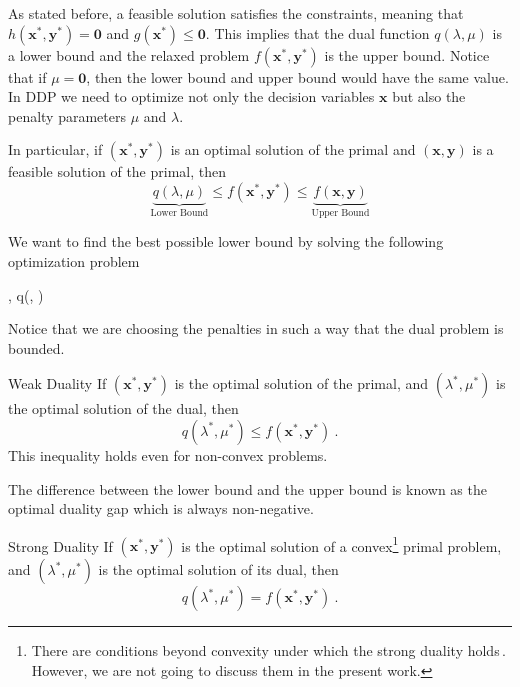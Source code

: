 As stated before, a feasible solution satisfies the constraints, meaning that $h(\mathbf{x}^{*}, \mathbf{y}^{*})=\mathbf{0}$ and $g(\mathbf{x}^{*}) \leq \mathbf{0}$. This implies that the dual function $q(\lambda,\mu)$ is a lower bound and the relaxed problem $f(\mathbf{x}^{*}, \mathbf{y}^{*})$ is the upper bound. Notice that if $\mu = \mathbf{0}$, then the lower bound and upper bound would have the same value. In DDP we need to optimize not only the decision variables $\mathbf{x}$ but also the penalty parameters $\mu$ and $\lambda$.
\begin{corollary}{}{}
  In particular, if $(\mathbf{x}^{*}, \mathbf{y}^{*})$ is an optimal solution of the primal and $(\mathbf{x}, \mathbf{y})$ is a feasible solution of the primal, then
  \begin{equation}
      \underbrace{q({\lambda,\mu})}_{\textrm{Lower Bound}} \leq f(\mathbf{x}^{*}, \mathbf{y}^{*}) \leq \underbrace{f(\mathbf{x}, \mathbf{y})}_{\textrm{Upper Bound}}
  \end{equation}
\end{corollary}
We want to find the best possible lower bound by solving the following optimization problem
\begin{maxi!}[2]
	{\lambda, \mu}{q(\lambda, \mu)}{\label{eq: Abstract_Dual}}{}{}
\end{maxi!}
Notice that we are choosing the penalties in such a way that the dual problem is bounded.
\begin{theorem}{Weak Duality}{}
If $(\mathbf{x}^{*}, \mathbf{y}^{*})$ is the optimal solution of the primal, and $(\lambda^{*}, \mu^{*})$ is the optimal solution of the dual, then
\begin{equation}
    q(\lambda^{*}, \mu^{*}) \leq f(\mathbf{x}^{*}, \mathbf{y}^{*})\ .
\end{equation}
This inequality holds even for non-convex problems.
\end{theorem}
The difference between the lower bound and the upper bound is known as the optimal duality gap which is always non-negative.
\begin{theorem}{Strong Duality}{}
If $(\mathbf{x}^{*}, \mathbf{y}^{*})$ is the optimal solution of a convex\footnote{There are conditions beyond convexity under which the strong duality holds\,\cite{Boyd2004}. However, we are not going to discuss them in the present work.} primal problem, and $(\lambda^{*}, \mu^{*})$ is the optimal solution of its dual, then
\begin{equation}
    q(\lambda^{*}, \mu^{*}) = f(\mathbf{x}^{*}, \mathbf{y}^{*})\ .
\end{equation}
\end{theorem}
